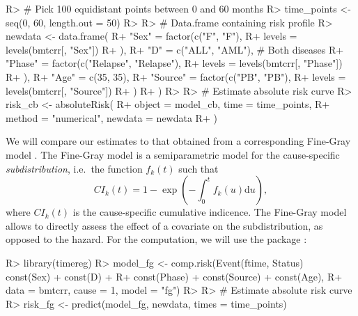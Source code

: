 \documentclass[
]{jss}
\begin{document}
\begin{CodeChunk}

\begin{CodeInput}
R> # Pick 100 equidistant points between 0 and 60 months
R> time_points <- seq(0, 60, length.out = 50)
R> 
R> # Data.frame containing risk profile
R> newdata <- data.frame(
R+   "Sex" = factor(c("F", "F"),
R+     levels = levels(bmtcrr[, "Sex"])
R+   ),
R+   "D" = c("ALL", "AML"), # Both diseases
R+   "Phase" = factor(c("Relapse", "Relapse"),
R+     levels = levels(bmtcrr[, "Phase"])
R+   ),
R+   "Age" = c(35, 35),
R+   "Source" = factor(c("PB", "PB"),
R+     levels = levels(bmtcrr[, "Source"])
R+   )
R+ )
R> 
R> # Estimate absolute risk curve
R> risk_cb <- absoluteRisk(
R+   object = model_cb, time = time_points,
R+   method = "numerical", newdata = newdata
R+ )
\end{CodeInput}
\end{CodeChunk}

We will compare our estimates to that obtained from a corresponding
Fine-Gray model \citeyearpar{fine1999proportional}. The Fine-Gray model
is a semiparametric model for the cause-specific \emph{subdistribution},
i.e.~the function \(f_k(t)\) such that
\[CI_k(t) =1 - \exp\left( - \int_0^t f_k(u) \textrm{d}u \right),\] where
\(CI_k(t)\) is the cause-specific cumulative indicence. The Fine-Gray
model allows to directly assess the effect of a covariate on the
subdistribution, as opposed to the hazard. For the computation, we will
use the  package \citep{timereg}:

\begin{CodeChunk}

\begin{CodeInput}
R> library(timereg)
R> model_fg <- comp.risk(Event(ftime, Status) ~ const(Sex) + const(D) +
R+                         const(Phase) + const(Source) + const(Age),
R+                       data = bmtcrr, cause = 1, model = "fg")
R> 
R> # Estimate absolute risk curve
R> risk_fg <- predict(model_fg, newdata, times = time_points)
\end{CodeInput}
\end{CodeChunk}
\end{document}
